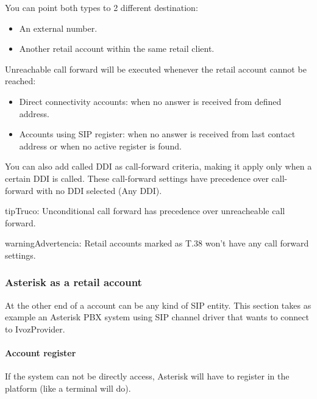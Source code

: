 \documentclass[letterpaper,10pt,spanish]{sphinxmanual}
\begin{document}
You can point both types to 2 different destination:
\begin{itemize}
\item {} 
An external number.

\item {} 
Another retail account within the same retail client.

\end{itemize}

Unreachable call forward will be executed whenever the retail account cannot be reached:
\begin{itemize}
\item {} 
Direct connectivity accounts: when no answer is received from defined address.

\item {} 
Accounts using SIP register: when no answer is received from last contact address or when no active register is found.

\end{itemize}

You can also add called DDI as call-forward criteria, making it apply only when a certain DDI is called. These call-forward
settings have precedence over call-forward with no DDI selected (Any DDI).

\begin{notice}{tip}{Truco:}
Unconditional call forward has precedence over unreacheable call forward.
\end{notice}

\begin{notice}{warning}{Advertencia:}
Retail accounts marked as T.38 won't have any call forward settings.
\end{notice}


\subsubsection{Asterisk as a retail account}
\label{administration_portal/client/retail/retail_accounts:asterisk-as-a-retail-account}
At the other end of a account can be any kind of SIP entity. This section takes
as example an Asterisk PBX system using SIP channel driver that wants to connect
to IvozProvider.


\paragraph{Account register}
\label{administration_portal/client/retail/retail_accounts:account-register}
If the system can not be directly access, Asterisk will have to register in the
platform (like a terminal will do).
\end{document}
